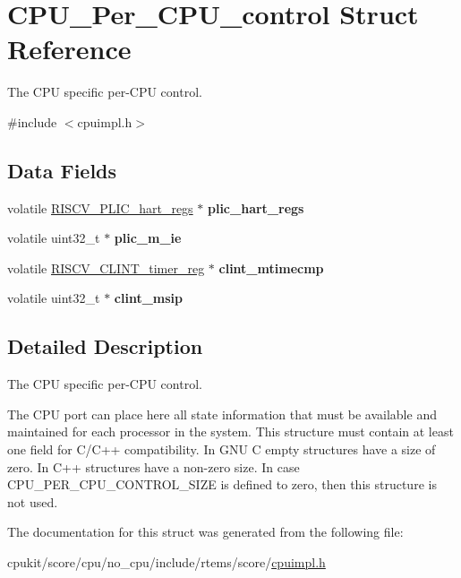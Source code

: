 \hypertarget{structCPU__Per__CPU__control}{}\section{C\+P\+U\+\_\+\+Per\+\_\+\+C\+P\+U\+\_\+control Struct Reference}
\label{structCPU__Per__CPU__control}


The C\+PU specific per-\/\+C\+PU control.  




{\ttfamily \#include $<$cpuimpl.\+h$>$}

\subsection*{Data Fields}
\begin{DoxyCompactItemize}
\item 
\mbox{\label{structCPU__Per__CPU__control_ac2f3177f4206dc3b79677c917d5ea92c}} 
volatile \mbox{\hyperlink{structRISCV__PLIC__hart__regs}{R\+I\+S\+C\+V\+\_\+\+P\+L\+I\+C\+\_\+hart\+\_\+regs}} $\ast$ {\bfseries plic\+\_\+hart\+\_\+regs}
\item 
\mbox{\label{structCPU__Per__CPU__control_abb826158e10e790975a586ec6ec162f0}} 
volatile uint32\+\_\+t $\ast$ {\bfseries plic\+\_\+m\+\_\+ie}
\item 
\mbox{\label{structCPU__Per__CPU__control_ad29af75abc54cdc94871d730ed08a349}} 
volatile \mbox{\hyperlink{unionRISCV__CLINT__timer__reg}{R\+I\+S\+C\+V\+\_\+\+C\+L\+I\+N\+T\+\_\+timer\+\_\+reg}} $\ast$ {\bfseries clint\+\_\+mtimecmp}
\item 
\mbox{\label{structCPU__Per__CPU__control_a42a515a4922bb7b8877305f10413a4b0}} 
volatile uint32\+\_\+t $\ast$ {\bfseries clint\+\_\+msip}
\end{DoxyCompactItemize}


\subsection{Detailed Description}
The C\+PU specific per-\/\+C\+PU control. 

The C\+PU port can place here all state information that must be available and maintained for each processor in the system. This structure must contain at least one field for C/\+C++ compatibility. In G\+NU C empty structures have a size of zero. In C++ structures have a non-\/zero size. In case C\+P\+U\+\_\+\+P\+E\+R\+\_\+\+C\+P\+U\+\_\+\+C\+O\+N\+T\+R\+O\+L\+\_\+\+S\+I\+ZE is defined to zero, then this structure is not used. 

The documentation for this struct was generated from the following file\+:\begin{DoxyCompactItemize}
\item 
cpukit/score/cpu/no\+\_\+cpu/include/rtems/score/\mbox{\hyperlink{no__cpu_2include_2rtems_2score_2cpuimpl_8h}{cpuimpl.\+h}}\end{DoxyCompactItemize}
